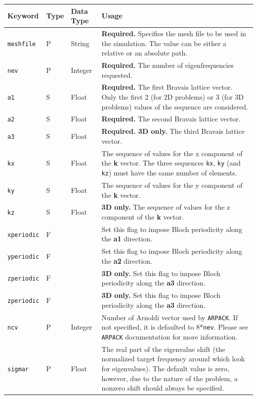 \documentclass[11pt,a4paper,oneside]{article}
\begin{document}
\newpage
\begin{center}
  \begin{tabular}{| l | l | l | p{230pt} |}
    \hline
   	Keyword & Type & Data Type & Usage \\ \hline
	{\tt meshfile} & P & String & {\bf Required.} Specifies the mesh file to be used in the simulation.  The value can be either a relative or an absolute path. \\ \hline
	{\tt nev} & P & Integer & {\bf Required.} The number of eigenfrequencies requested. \\ \hline
	{\tt a1} & S & Float & {\bf Required.} The first Bravais lattice vector. Only the first 2 (for 2D problems) or 3 (for 3D problems) values of the sequence are considered.\\ \hline
	{\tt a2} & S & Float & {\bf Required.} The second Bravais lattice vector. \\ \hline
	{\tt a3} & S & Float & {\bf Required. 3D only.} The third Bravais lattice vector. \\ \hline
	{\tt kx} & S & Float & The sequence of values for the x component of the {\bf k} vector. The three sequences {\tt kx}, {\tt ky} (and {\tt kz}) must have the same number of elements. \\ \hline
	{\tt ky} & S & Float & The sequence of values for the y component of the {\bf k} vector. \\ \hline
	{\tt kz} & S & Float & {\bf 3D only.}  The sequence of values for the z component of the {\bf k} vector. \\ \hline
	{\tt xperiodic} & F &  & Set this flag to impose Bloch periodicity along the {\bf a1} direction. \\ \hline
	{\tt yperiodic} & F &  & Set this flag to impose Bloch periodicity along the {\bf a2} direction. \\ \hline
	{\tt zperiodic} & F &  & {\bf 3D only.} Set this flag to impose Bloch periodicity along the {\bf a3} direction. \\ \hline
	{\tt zperiodic} & F &  & {\bf 3D only.} Set this flag to impose Bloch periodicity along the {\bf a3} direction. \\ \hline
	{\tt ncv} & P & Integer & Number of Arnoldi vector used by {\tt ARPACK}. If not specified, it is defaulted to 8*{\tt nev}. Please see {\tt ARPACK} documentation for more information. \\ \hline
	{\tt sigmar} & P & Float & The real part of the eigenvalue shift (the normalized target frequency around which look for	eigenvalues). The default value is zero, however, due to the nature of the problem, a nonzero shift should always be specified. \\ \hline

\end{tabular}
\end{center}
\end{document}
